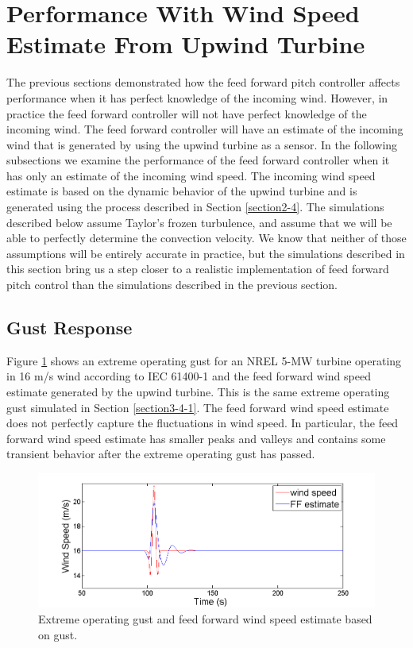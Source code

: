 \section{Performance With Wind Speed Estimate From Upwind Turbine} \label{section3-5}
The previous sections demonstrated how the feed forward pitch controller affects performance when it has perfect knowledge of the incoming wind. However, in practice the feed forward controller will not have perfect knowledge of the incoming wind. The feed forward controller will have an estimate of the incoming wind that is generated by using the upwind turbine as a sensor. In the following subsections we examine the performance of the feed forward controller when it has only an estimate of the incoming wind speed. The incoming wind speed estimate is based on the dynamic behavior of the upwind turbine and is generated using the process described in Section \ref{section2-4}. The simulations described below assume Taylor's frozen turbulence, and assume that we will be able to perfectly determine the convection velocity. We know that neither of those assumptions will be entirely accurate in practice, but the simulations described in this section bring us a step closer to a realistic implementation of feed forward pitch control than the simulations described in the previous section.

\subsection{Gust Response} \label{section3-5-1}
Figure \ref{fig3-24} shows an extreme operating gust for an NREL 5-MW turbine operating in 16 m/s wind according to IEC 61400-1 \cite{IEC2005} and the feed forward wind speed estimate generated by the upwind turbine. This is the same extreme operating gust simulated in Section \ref{section3-4-1}. The feed forward wind speed estimate does not perfectly capture the fluctuations in wind speed. In particular, the feed forward wind speed estimate has smaller peaks and valleys and contains some transient behavior after the extreme operating gust has passed.



\begin{figure}[htbp]
	\centering
		\includegraphics[trim = {1cm 0 2cm 0}, clip, width = \linewidth]{Figures/ch3Figures/fig3-24.png}
		
	\caption{Extreme operating gust and feed forward wind speed estimate based on gust.}
	\label{fig3-24}
\end{figure}

